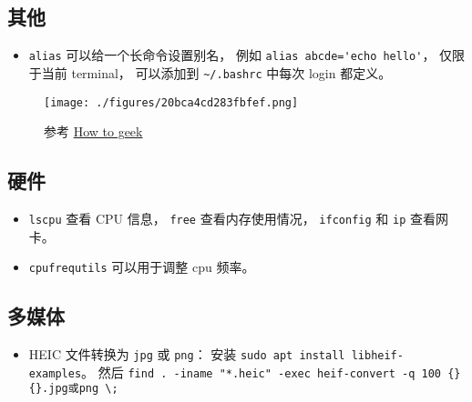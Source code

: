 \subsection{其他}
\begin{itemize}
\item \verb`alias` 可以给一个长命令设置别名， 例如 \verb`alias abcde='echo hello'`， 仅限于当前 terminal， 可以添加到 \verb`~/.bashrc` 中每次 login 都定义。
\end{itemize}

\begin{figure}[ht]
\centering
\texttt{[image: ./figures/20bca4cd283fbfef.png]}
\caption{参考 \href{https://www.howtogeek.com/}{How to geek}} \label{fig_LinNt_1}
\end{figure}

\subsection{硬件}
\begin{itemize}
\item \verb`lscpu` 查看 CPU 信息， \verb`free` 查看内存使用情况， \verb`ifconfig` 和 \verb`ip` 查看网卡。
\item \verb`cpufrequtils` 可以用于调整 cpu 频率。
\end{itemize}

\subsection{多媒体}
\begin{itemize}
\item HEIC 文件转换为 \verb`jpg` 或 \verb`png`： 安装 \verb`sudo apt install libheif-examples`。 然后 \verb`find . -iname "*.heic" -exec heif-convert -q 100 {} {}.jpg或png \;`
\end{itemize}
